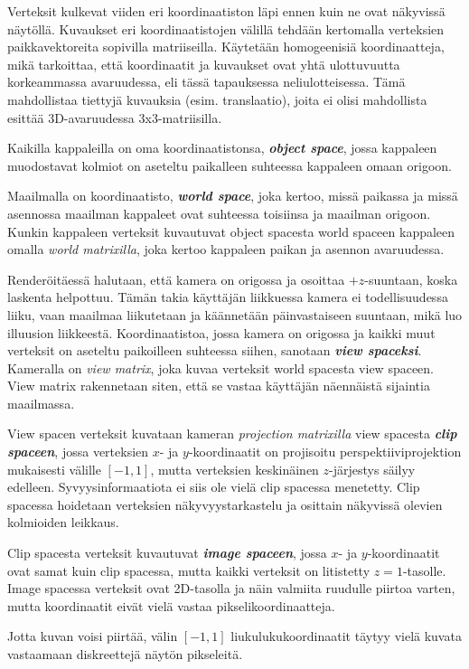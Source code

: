 \documentclass[12pt] {article}
\newcommand{\textbi}[1]{\textit{\textbf{#1}}}
\begin{document}
Verteksit kulkevat viiden eri koordinaatiston läpi ennen kuin ne ovat näkyvissä näytöllä. Kuvaukset eri koordinaatistojen välillä tehdään kertomalla verteksien paikkavektoreita sopivilla matriiseilla. Käytetään homogeenisiä koordinaatteja, mikä tarkoittaa, että koordinaatit ja kuvaukset ovat yhtä ulottuvuutta korkeammassa avaruudessa, eli tässä tapauksessa neliulotteisessa. Tämä mahdollistaa tiettyjä kuvauksia (esim. translaatio), joita ei olisi mahdollista esittää 3D-avaruudessa 3x3-matriisilla. 

Kaikilla kappaleilla on oma koordinaatistonsa, \textbi{object space}, jossa kappaleen muodostavat kolmiot on aseteltu paikalleen suhteessa kappaleen omaan origoon.

Maailmalla on koordinaatisto, \textbi{world space}, joka kertoo, missä paikassa ja missä asennossa maailman kappaleet ovat suhteessa toisiinsa ja maailman origoon. Kunkin kappaleen verteksit kuvautuvat object spacesta world spaceen kappaleen omalla \textit{world matrixilla}, joka kertoo kappaleen paikan ja asennon avaruudessa.

Renderöitäessä halutaan, että kamera on origossa ja osoittaa $+z$-suuntaan, koska laskenta helpottuu. Tämän takia käyttäjän liikkuessa kamera ei todellisuudessa liiku, vaan maailmaa liikutetaan ja käännetään päinvastaiseen suuntaan, mikä luo illuusion liikkeestä. Koordinaatistoa, jossa kamera on origossa ja kaikki muut verteksit on aseteltu paikoilleen suhteessa siihen, sanotaan \textbi{view spaceksi}. Kameralla on \textit{view matrix}, joka kuvaa verteksit world spacesta view spaceen. View matrix rakennetaan siten, että se vastaa käyttäjän näennäistä sijaintia maailmassa.

View spacen verteksit kuvataan kameran \textit{projection matrixilla} view spacesta \textbi{clip spaceen}, jossa verteksien $x$- ja $y$-koordinaatit on projisoitu perspektiiviprojektion mukaisesti välille $[-1, 1]$, mutta verteksien keskinäinen $z$-järjestys säilyy edelleen. Syvyysinformaatiota ei siis ole vielä clip spacessa menetetty. Clip spacessa hoidetaan verteksien näkyvyystarkastelu ja osittain näkyvissä olevien kolmioiden leikkaus.

Clip spacesta verteksit kuvautuvat \textbi{image spaceen}, jossa $x$- ja $y$-koordinaatit ovat samat kuin clip spacessa, mutta kaikki verteksit on litistetty $z = 1$-tasolle. Image spacessa verteksit ovat 2D-tasolla ja näin valmiita ruudulle piirtoa varten, mutta koordinaatit eivät vielä vastaa pikselikoordinaatteja.

Jotta kuvan voisi piirtää, välin $[-1, 1]$ liukulukukoordinaatit täytyy vielä kuvata vastaamaan diskreettejä näytön pikseleitä. 
\end{document}
